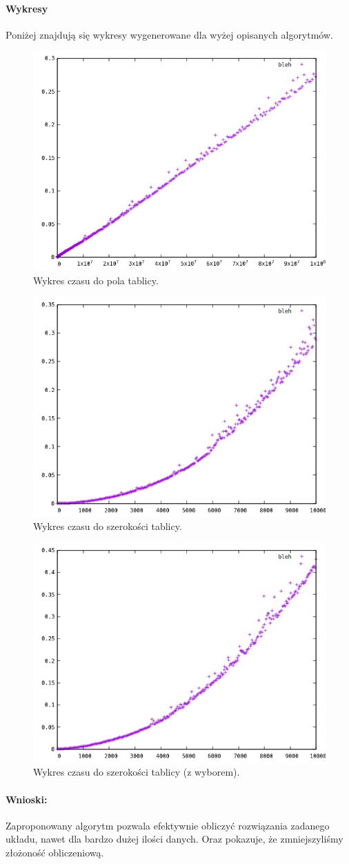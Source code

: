 \documentclass{article}
\begin{document}
	\paragraph{Wykresy}
	Poniżej znajdują się wykresy wygenerowane dla wyżej opisanych algorytmów.
	\begin{figure}[H]
		\centering
		\includegraphics[width=0.6\linewidth]{wykres.png}
		\caption{Wykres czasu do pola tablicy.}		
	\end{figure}
	\begin{figure}[H]
	\centering
	\includegraphics[width=0.6\linewidth]{wykres1.png}
	\caption{Wykres czasu do szerokości tablicy.}		
\end{figure}

	\begin{figure}[H]
	\centering
	\includegraphics[width=0.6\linewidth]{wykres3.png}
	\caption{Wykres czasu do szerokości tablicy (z wyborem).}		
\end{figure}

	\paragraph{Wnioski:}
Zaproponowany algorytm pozwala efektywnie obliczyć rozwiązania zadanego układu, nawet dla bardzo dużej ilości danych. Oraz pokazuje, że zmniejszyliśmy złożoność obliczeniową.
	
\end{document}
